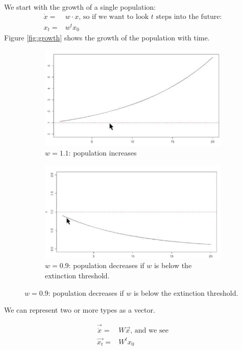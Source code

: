 \documentclass[]{article}
\begin{document}
We start with the growth of a single population:
\begin{align*}
	\dot{x} =& w \cdot x \text{, so if we want to look $t$ steps into the future:}\\
	x_t =& w^t x_0
\end{align*}
Figure \ref{fig:growth} shows the growth of the population with time.
\begin{figure}[H]
	\caption{Growth of Population}\label{fig:growth}
	\begin{subfigure}[t]{0.45\textwidth}
		\caption{$w=1.1$: population increases}\label{fig:growth1}
		\includegraphics[width=\textwidth]{growth1}
	\end{subfigure}
	\;\;\;
	\begin{subfigure}[t]{0.45\textwidth}
		\caption{$w=0.9$: population decreases if $w$ is below the extinction threshold.}\label{fig:growth2}
		\includegraphics[width=\textwidth]{growth2}
	\end{subfigure}
\end{figure}

We can represent two or more types as a vector.

\begin{align*}
	\vec{\dot{x}} =& W \vec{x} \text{, and we see}\\
	\vec{x_t}=& W^t x_0 
\end{align*}
\end{document}
